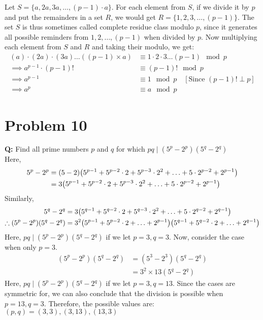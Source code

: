 Let $S = \{a, 2a, 3a, \ldots, (p-1)\cdot a\}$. For each element from $S$, if we divide it by $p$ and put the remainders in a set $R$, we would get $R = \{1,2,3,\ldots,(p-1)\}$. The set $S$ is thus sometimes called complete residue class modulo $p$, since it generates all possible reminders from $1,2,\ldots,(p-1)$ when divided by $p$. Now multiplying each element from $S$ and $R$ and taking their modulo, we get:
\begin{align*}
    (a)\cdot(2a)\cdot(3a)\ldots\left((p-1)\times a\right) & \equiv 1\cdot2\cdot3\ldots(p-1) \mod{p}              \\
    \implies a^{p-1} \cdot (p-1)!                         & \equiv (p-1)! \mod{p}                                \\
    \implies a^{p-1}                                      & \equiv 1 \mod{p} \quad [\text{Since } (p-1)!\perp p] \\
    \implies a^p                                          & \equiv a \mod{p}
\end{align*}
\section*{Problem 10}
\textbf{Q: }Find all prime numbers $p$ and $q$ for which $pq\mid(5^p-2^p)(5^q-2^q)$\\

Here,
\begin{align*}
    5^p-2^p & = (5-2)\brf*{5^{p-1}+5^{p-2}\cdot 2 + 5^{p-3}\cdot 2^2 + \ldots + 5\cdot2^{p-2} + 2^{p-1}} \\
            & =3\brf*{5^{p-1}+5^{p-2}\cdot 2 + 5^{p-3}\cdot 2^2 + \ldots + 5\cdot2^{p-2} + 2^{p-1}}
\end{align*}
Similarly,
\begin{align*}
    5^q-2^q                       & = 3\brf*{5^{q-1}+5^{q-2}\cdot 2 + 5^{q-3}\cdot 2^2 + \ldots + 5\cdot2^{q-2} + 2^{q-1}}        \\
    \therefore (5^p-2^p)(5^q-2^q) & = 3^2\brf*{5^{p-1}+5^{p-2}\cdot 2+\ldots+2^{p-1}}\brf*{5^{q-1}+5^{q-2}\cdot 2+\ldots+2^{q-1}}
\end{align*}
Here, $pq \mid (5^p-2^p)(5^q-2^q)$ if we let $p=3, q=3$. Now, consider the case when only $p=3$.
\begin{align*}
    (5^p-2^p)(5^q-2^q) & = (5^3-2^3)(5^q-2^q)  \\
                       & =3^2\times13(5^q-2^q)
\end{align*}
Here, $pq \mid (5^p-2^p)(5^q-2^q)$ if we let $p=3, q=13$. Since the cases are symmetric for, we can also conclude that the division is possible when $p=13, q=3$. Therefore, the possible values are: $(p,q) = (3,3), (3,13), (13,3)$
\clearpage
